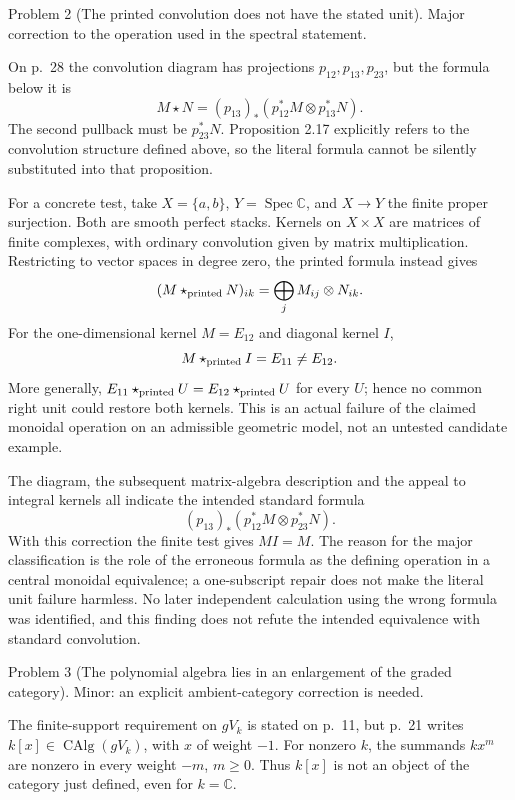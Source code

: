 \documentclass[10pt]{article}
\begin{document}
Problem 2 (The printed convolution does not have the stated unit).  Major correction to the operation used in the spectral statement.\par
On p. 28 the convolution diagram has projections \(p_{12},p_{13},p_{23}\), but the formula below it is \[M\star N=(p_{13})_*(p_{12}^*M\otimes p_{13}^*N).\] The second pullback must be \(p_{23}^*N\). Proposition 2.17 explicitly refers to the convolution structure defined above, so the literal formula cannot be silently substituted into that proposition.\par
For a concrete test, take \(X=\{a,b\}\), \(Y=\operatorname{Spec}\mathbb C\), and \(X\to Y\) the finite proper surjection. Both are smooth perfect stacks. Kernels on \(X\times X\) are matrices of finite complexes, with ordinary convolution given by matrix multiplication. Restricting to vector spaces in degree zero, the printed formula instead gives \[(M\star_{\rm printed}N)_{ik}
                   =\bigoplus_j M_{ij}\otimes N_{ik}.\] For the one-dimensional kernel \(M=E_{12}\) and diagonal kernel \(I\), \[M\star_{\rm printed}I=E_{11}\ne E_{12}.\] More generally, \(E_{11}\star_{\rm printed}U=E_{12}\star_{\rm printed}U\) for every \(U\); hence no common right unit could restore both kernels. This is an actual failure of the claimed monoidal operation on an admissible geometric model, not an untested candidate example.\par
The diagram, the subsequent matrix-algebra description and the appeal to integral kernels all indicate the intended standard formula \[(p_{13})_*(p_{12}^*M\otimes p_{23}^*N).\] With this correction the finite test gives \(MI=M\). The reason for the major classification is the role of the erroneous formula as the defining operation in a central monoidal equivalence; a one-subscript repair does not make the literal unit failure harmless. No later independent calculation using the wrong formula was identified, and this finding does not refute the intended equivalence with standard convolution.\par
Problem 3 (The polynomial algebra lies in an enlargement of the graded category).  Minor: an explicit ambient-category correction is needed.\par
The finite-support requirement on \(gV_k\) is stated on p. 11, but p. 21 writes \(k[x]\in\operatorname{CAlg}(gV_k)\), with \(x\) of weight \(-1\). For nonzero \(k\), the summands \(kx^m\) are nonzero in every weight \(-m\), \(m\geq0\). Thus \(k[x]\) is not an object of the category just defined, even for \(k=\mathbb C\).\par
\end{document}
